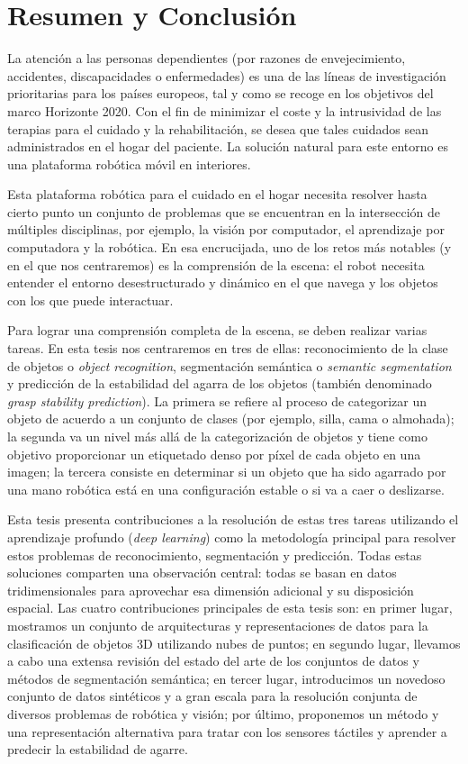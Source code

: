 \chapter{Resumen y Conclusión}
\label{cha:conclusion_sp}

La atención a las personas dependientes (por razones de envejecimiento, accidentes, discapacidades o enfermedades) es una de las líneas de investigación prioritarias para los países europeos, tal y como se recoge en los objetivos del marco Horizonte 2020. Con el fin de minimizar el coste y la intrusividad de las terapias para el cuidado y la rehabilitación, se desea que tales cuidados sean administrados en el hogar del paciente. La solución natural para este entorno es una plataforma robótica móvil en interiores.

Esta plataforma robótica para el cuidado en el hogar necesita resolver hasta cierto punto un conjunto de problemas que se encuentran en la intersección de múltiples disciplinas, por ejemplo, la visión por computador, el aprendizaje por computadora y la robótica. En esa encrucijada, uno de los retos más notables (y en el que nos centraremos) es la comprensión de la escena: el robot necesita entender el entorno desestructurado y dinámico en el que navega y los objetos con los que puede interactuar.

Para lograr una comprensión completa de la escena, se deben realizar varias tareas. En esta tesis nos centraremos en tres de ellas: reconocimiento de la clase de objetos o \emph{object recognition}, segmentación semántica o \emph{semantic segmentation} y predicción de la estabilidad del agarra de los objetos (también denominado \emph{grasp stability prediction}). La primera se refiere al proceso de categorizar un objeto de acuerdo a un conjunto de clases (por ejemplo, silla, cama o almohada); la segunda va un nivel más allá de la categorización de objetos y tiene como objetivo proporcionar un etiquetado denso por píxel de cada objeto en una imagen; la tercera consiste en determinar si un objeto que ha sido agarrado por una mano robótica está en una configuración estable o si va a caer o deslizarse.

Esta tesis presenta contribuciones a la resolución de estas tres tareas utilizando el aprendizaje profundo (\emph{deep learning}) como la metodología principal para resolver estos problemas de reconocimiento, segmentación y predicción. Todas estas soluciones comparten una observación central: todas se basan en datos tridimensionales para aprovechar esa dimensión adicional y su disposición espacial. Las cuatro contribuciones principales de esta tesis son: en primer lugar, mostramos un conjunto de arquitecturas y representaciones de datos para la clasificación de objetos 3D utilizando nubes de puntos; en segundo lugar, llevamos a cabo una extensa revisión del estado del arte de los conjuntos de datos y métodos de segmentación semántica; en tercer lugar, introducimos un novedoso conjunto de datos sintéticos y a gran escala para la resolución conjunta de diversos problemas de robótica y visión; por último, proponemos un método y una representación alternativa para tratar con los sensores táctiles y aprender a predecir la estabilidad de agarre.

